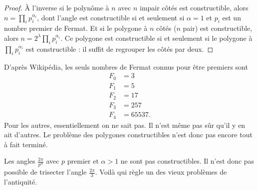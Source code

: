 \begin{proof}
	À l'inverse si le polynôme à \( n\) avec \( n\) impair côtés est constructible, alors \( n=\prod_ip_i^{\alpha_i}\), dont l'angle est constructible si et seulement si \( \alpha=1\) et \( p_i\) est un nombre premier de Fermat. Et si le polygone à \( n\) côtés (\( n\) pair) est constructible, alors \( n=2^{\lambda}\prod_ip_i^{\alpha_i}\). Ce polygone est constructible si et seulement si le polygone à \( \prod_ip_i^{\alpha_i}\) est constructible : il suffit de regrouper les côtés par deux.
\end{proof}

\begin{remark}
	D'après Wikipédia\cite{PLQooFQtjyR}, les seuls nombres de Fermat connus pour être premiers sont
	\begin{subequations}
		\begin{align}
			F_0 & =3      \\
			F_1 & =5      \\
			F_2 & =17     \\
			F_3 & =257    \\
			F_4 & =65537.
		\end{align}
	\end{subequations}
	Pour les autres, essentiellement on ne sait pas. Il n'est même pas sûr qu'il y en ait d'autres. Le problème des polygones constructibles n'est donc pas encore tout à fait terminé.
\end{remark}

\begin{remark}
	Les angles \( \frac{ 2\pi }{ p^{\alpha} }\) avec \( p\) premier et \( \alpha>1\) ne sont pas constructibles. Il n'est donc pas possible de trisecter l'angle \( \frac{ 2\pi }{ 3 }\). Voilà qui règle un des vieux problèmes de l'antiquité.
\end{remark}
